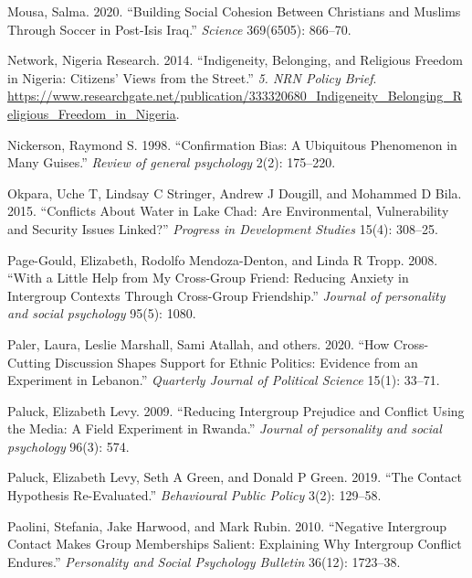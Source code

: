 \documentclass[11pt]{article}
\begin{document}
\begin{cslreferences}
\leavevmode\hypertarget{ref-mousa2020building}{}%
Mousa, Salma. 2020. ``Building Social Cohesion Between Christians and
Muslims Through Soccer in Post-Isis Iraq.'' \emph{Science} 369(6505):
866--70.

\leavevmode\hypertarget{ref-nigeria2014freedom}{}%
Network, Nigeria Research. 2014. ``Indigeneity, Belonging, and Religious
Freedom in Nigeria: Citizens' Views from the Street.'' \emph{5. NRN
Policy Brief}.
\url{https://www.researchgate.net/publication/333320680_Indigeneity_Belonging_Religious_Freedom_in_Nigeria}.

\leavevmode\hypertarget{ref-nickerson1998confirmation}{}%
Nickerson, Raymond S. 1998. ``Confirmation Bias: A Ubiquitous Phenomenon
in Many Guises.'' \emph{Review of general psychology} 2(2): 175--220.

\leavevmode\hypertarget{ref-okpara2015conflicts}{}%
Okpara, Uche T, Lindsay C Stringer, Andrew J Dougill, and Mohammed D
Bila. 2015. ``Conflicts About Water in Lake Chad: Are Environmental,
Vulnerability and Security Issues Linked?'' \emph{Progress in
Development Studies} 15(4): 308--25.

\leavevmode\hypertarget{ref-page2008little}{}%
Page-Gould, Elizabeth, Rodolfo Mendoza-Denton, and Linda R Tropp. 2008.
``With a Little Help from My Cross-Group Friend: Reducing Anxiety in
Intergroup Contexts Through Cross-Group Friendship.'' \emph{Journal of
personality and social psychology} 95(5): 1080.

\leavevmode\hypertarget{ref-paler2020cross}{}%
Paler, Laura, Leslie Marshall, Sami Atallah, and others. 2020. ``How
Cross-Cutting Discussion Shapes Support for Ethnic Politics: Evidence
from an Experiment in Lebanon.'' \emph{Quarterly Journal of Political
Science} 15(1): 33--71.

\leavevmode\hypertarget{ref-paluck2009jsp}{}%
Paluck, Elizabeth Levy. 2009. ``Reducing Intergroup Prejudice and
Conflict Using the Media: A Field Experiment in Rwanda.'' \emph{Journal
of personality and social psychology} 96(3): 574.

\leavevmode\hypertarget{ref-paluck2019contact}{}%
Paluck, Elizabeth Levy, Seth A Green, and Donald P Green. 2019. ``The
Contact Hypothesis Re-Evaluated.'' \emph{Behavioural Public Policy}
3(2): 129--58.

\leavevmode\hypertarget{ref-paolini2010negative}{}%
Paolini, Stefania, Jake Harwood, and Mark Rubin. 2010. ``Negative
Intergroup Contact Makes Group Memberships Salient: Explaining Why
Intergroup Conflict Endures.'' \emph{Personality and Social Psychology
Bulletin} 36(12): 1723--38.


\end{cslreferences}
\end{document}
